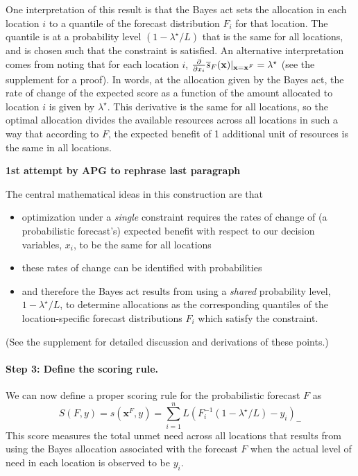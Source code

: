 \documentclass{article}
\begin{document}
One interpretation of this result is that the Bayes act sets the allocation in each location $i$ to a quantile of the forecast distribution $F_i$ for that location. The quantile is at a probability level $(1 - \lambda^{\star}/L)$ that is the same for all locations, and is chosen such that the constraint is satisfied. An alternative interpretation comes from noting that for each location $i$, $\frac{\partial}{\partial x_i} \overline{s}_F(\mathbf{x}) \vert_{\mathbf{x}=\mathbf{x}^F} = \lambda^{\star}$ (see the supplement for a proof).
In words, at the allocation given by the Bayes act, the rate of change of the expected score as a function of the amount allocated to location $i$ is given by $\lambda^{\star}$.
This derivative is the same for all locations, so the optimal allocation divides the available resources across all locations in such a way that according to $F$, the expected benefit of 1 additional unit of resources is the same in all locations.

\textbf{1st attempt by APG to rephrase last paragraph}

The central mathematical ideas in this construction are that 
\begin{itemize}
\item optimization under a \emph{single} constraint requires the rates of change of (a probabilistic forecast's) expected benefit with respect to our decision variables, $x_i$, to be the same for all locations 
\item these rates of change can be identified with probabilities
\item and therefore the Bayes act results from using a \emph{shared} probability level, $1 - \lambda^{\star}/L$, to determine allocations as the corresponding quantiles of the location-specific forecast distributions $F_i$ which satisfy the constraint.
\end{itemize}
(See the supplement for detailed discussion and derivations of these points.)
 
\paragraph{Step 3: Define the scoring rule.} We can now define a proper scoring rule for the probabilistic forecast $F$ as
\begin{equation}
S(F, y) = s(\mathbf{x}^F, y) = \sum_{i=1}^n L (F_i^{-1}(1 - \lambda^{\star}/L) - y_i)_-
\end{equation}
This score measures the total unmet need across all locations that results from using the Bayes allocation associated with the forecast $F$ when the actual level of need in each location is observed to be $y_i$.
\end{document}
